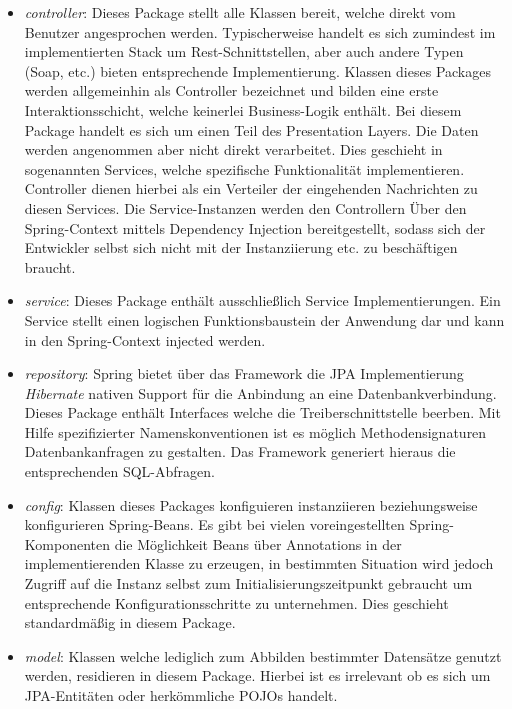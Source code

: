 \begin{itemize}
  \item \emph{controller}: Dieses Package stellt alle Klassen bereit, welche direkt vom Benutzer angesprochen werden. Typischerweise handelt es sich zumindest im implementierten Stack um Rest-Schnittstellen, aber auch andere Typen (Soap, etc.) bieten entsprechende Implementierung. Klassen dieses Packages werden allgemeinhin als Controller bezeichnet und bilden eine erste Interaktionsschicht, welche keinerlei Business-Logik enthält. Bei diesem Package handelt es sich um einen Teil des Presentation Layers. Die Daten werden angenommen aber nicht direkt verarbeitet. Dies geschieht in sogenannten Services, welche spezifische Funktionalität implementieren. Controller dienen hierbei als ein Verteiler der eingehenden Nachrichten zu diesen Services. Die Service-Instanzen werden den Controllern Über den Spring-Context mittels Dependency Injection bereitgestellt, sodass sich der Entwickler selbst sich nicht mit der Instanziierung etc. zu beschäftigen braucht. 

  \item \emph{service}: Dieses Package enthält ausschließlich Service Implementierungen. Ein Service stellt einen logischen Funktionsbaustein der Anwendung dar und kann in den Spring-Context injected werden.

  \item \emph{repository}: Spring bietet über das Framework die JPA Implementierung \emph{Hibernate} nativen Support für die Anbindung an eine Datenbankverbindung. Dieses Package enthält Interfaces welche die Treiberschnittstelle beerben. Mit Hilfe spezifizierter Namenskonventionen ist es möglich Methodensignaturen Datenbankanfragen zu gestalten. Das Framework generiert hieraus die entsprechenden SQL-Abfragen.

  \item \emph{config}: Klassen dieses Packages konfiguieren instanziieren beziehungsweise konfigurieren Spring-Beans. Es gibt bei vielen voreingestellten Spring-Komponenten die Möglichkeit Beans über Annotations in der implementierenden Klasse zu erzeugen, in bestimmten Situation wird jedoch Zugriff auf die Instanz selbst zum Initialisierungszeitpunkt gebraucht um entsprechende Konfigurationsschritte zu unternehmen. Dies geschieht standardmäßig in diesem Package.

  \item \emph{model}: Klassen welche lediglich zum Abbilden bestimmter Datensätze genutzt werden, residieren in diesem Package. Hierbei ist es irrelevant ob es sich um JPA-Entitäten oder herkömmliche POJOs handelt.


\end{itemize}
